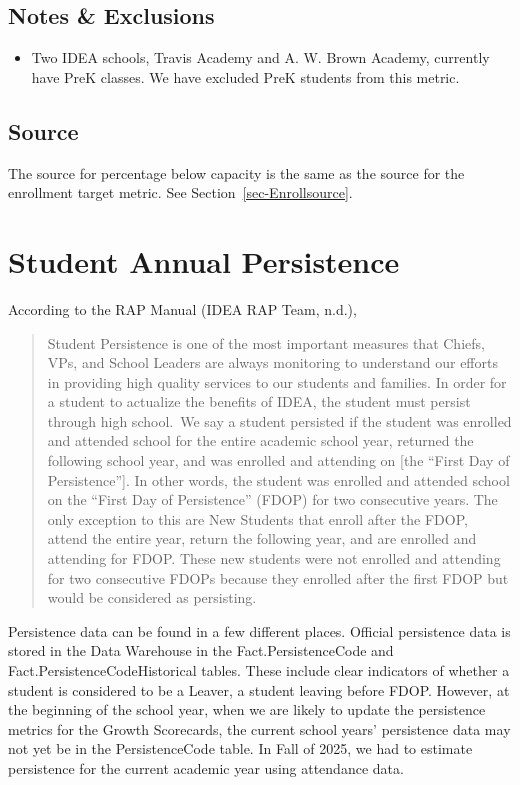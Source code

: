\documentclass[
  letterpaper,
  DIV=11,
  numbers=noendperiod]{scrreprt}
\providecommand{\tightlist}{%
  \setlength{\itemsep}{0pt}\setlength{\parskip}{0pt}}
\begin{document}
\subsection{Notes \& Exclusions}\label{notes-exclusions-7}

\begin{itemize}
\tightlist
\item
  Two IDEA schools, Travis Academy and A. W. Brown Academy, currently
  have PreK classes. We have excluded PreK students from this metric.
\end{itemize}

\subsection{Source}\label{source-9}

The source for percentage below capacity is the same as the source for
the enrollment target metric. See Section~\ref{sec-Enrollsource}.

\section{Student Annual Persistence}\label{sec-06Persist}

According to the RAP Manual (IDEA RAP Team, n.d.),

\begin{quote}
Student Persistence is one of the most important measures that Chiefs,
VPs, and School Leaders are always monitoring to understand our efforts
in providing high quality services to our students and families. In
order for a student to actualize the benefits of IDEA, the student must
persist through high school.~We say a student persisted if the student
was enrolled and attended school for the entire academic school year,
returned the following school year, and was enrolled and attending on
{[}the ``First Day of Persistence''{]}. In other words, the student was
enrolled and attended school on the ``First Day of Persistence'' (FDOP)
for two consecutive years. The only exception to this are New Students
that enroll after the FDOP, attend the entire year, return the following
year, and are enrolled and attending for FDOP. These new students were
not enrolled and attending for two consecutive FDOPs because they
enrolled after the first FDOP but would be considered as persisting.
\end{quote}

Persistence data can be found in a few different places. Official
persistence data is stored in the Data Warehouse in the
Fact.PersistenceCode and Fact.PersistenceCodeHistorical tables. These
include clear indicators of whether a student is considered to be a
Leaver, a student leaving before FDOP. However, at the beginning of the
school year, when we are likely to update the persistence metrics for
the Growth Scorecards, the current school years' persistence data may
not yet be in the PersistenceCode table. In Fall of 2025, we had to
estimate persistence for the current academic year using attendance
data.
\end{document}
